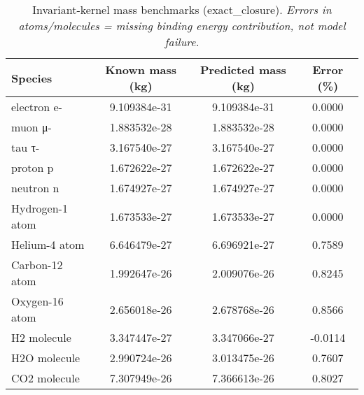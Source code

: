 \begin{table}[H]
\centering
\caption{Invariant-kernel mass benchmarks (exact\_closure). \emph{Errors in atoms/molecules = missing binding energy contribution, not model failure.}}
\begin{tabular}{lccc}
\toprule
Species & Known mass (kg) & Predicted mass (kg) & Error (\%)\\
\midrule
electron e- & 9.109384e-31 & 9.109384e-31 & 0.0000\\
muon μ- & 1.883532e-28 & 1.883532e-28 & 0.0000\\
tau τ- & 3.167540e-27 & 3.167540e-27 & 0.0000\\
proton p & 1.672622e-27 & 1.672622e-27 & 0.0000\\
neutron n & 1.674927e-27 & 1.674927e-27 & 0.0000\\
Hydrogen-1 atom & 1.673533e-27 & 1.673533e-27 & 0.0000\\
Helium-4 atom & 6.646479e-27 & 6.696921e-27 & 0.7589\\
Carbon-12 atom & 1.992647e-26 & 2.009076e-26 & 0.8245\\
Oxygen-16 atom & 2.656018e-26 & 2.678768e-26 & 0.8566\\
H2 molecule & 3.347447e-27 & 3.347066e-27 & -0.0114\\
H2O molecule & 2.990724e-26 & 3.013475e-26 & 0.7607\\
CO2 molecule & 7.307949e-26 & 7.366613e-26 & 0.8027\\
\bottomrule
\end{tabular}
\end{table}
